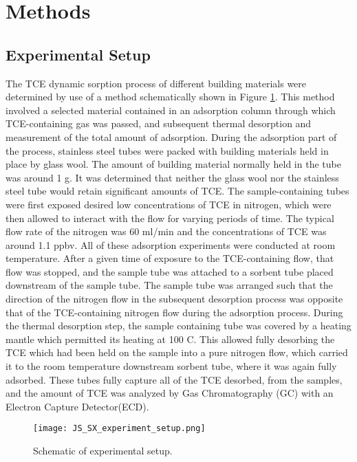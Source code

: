\section{Methods}\label{sec:methods}

\subsection{Experimental Setup}\label{sec:experimental_method}

The TCE  dynamic sorption process of different building materials were determined by use of a method schematically shown in Figure \ref{fig:js_sx_setup}.
This method involved a selected material contained in an adsorption column through which TCE-containing gas was passed, and subsequent thermal desorption and measurement of the total amount of adsorption.
During the adsorption part of the process, stainless steel tubes were packed with building materials held in place by glass wool.
The amount of building material normally held in the tube was around 1 g. %
It was determined that neither the glass wool nor the stainless steel tube would retain significant amounts of TCE.
The sample-containing tubes were first exposed desired low concentrations of TCE in nitrogen, which were then allowed to interact with the flow for varying periods of time.
The typical flow rate of the nitrogen was 60 ml/min and the concentrations of TCE was around 1.1 ppbv.
All of these adsorption experiments were conducted at room temperature.
After a given time of exposure to the TCE-containing flow, that flow was stopped, and the sample tube was attached to a sorbent tube placed downstream of the sample tube.
The sample tube was arranged such that the direction of the nitrogen flow in the subsequent desorption process was opposite that of the TCE-containing nitrogen flow during the adsorption process.
During the thermal desorption step, the sample containing tube was covered by a heating mantle which permitted its heating at 100 \degree C.
This allowed fully desorbing the TCE which had been held on the sample into a pure nitrogen flow, which carried it to the room temperature downstream sorbent tube, where it was again fully adsorbed.
These tubes fully capture all of the TCE desorbed, from the samples, and the amount of TCE was analyzed by Gas Chromatography (GC) with an  Electron Capture Detector(ECD).

\begin{figure}
  \texttt{[image: JS\_SX\_experiment\_setup.png]}
  \caption{Schematic of experimental setup.} %
  \label{fig:js_sx_setup}
\end{figure}

